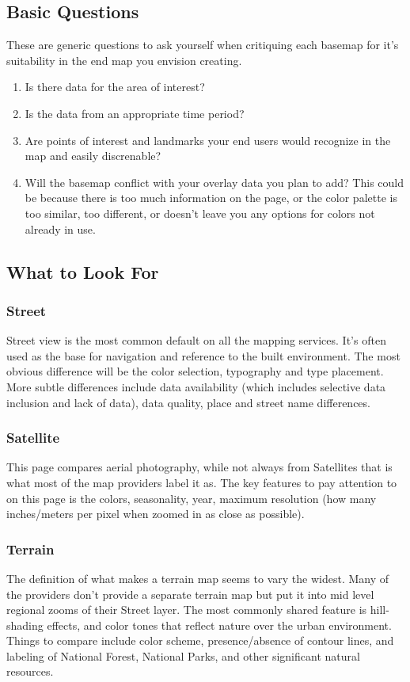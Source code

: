 \documentclass[12pt,letterpaper]{article}
\begin{document}
\subsection{Basic Questions}
These are generic questions to ask yourself when critiquing each basemap for it's suitability in the end map you envision creating.
\begin{enumerate}
\item Is there data for the area of interest?
\item Is the data from an appropriate time period?
\item Are points of interest and landmarks your end users would recognize in the map and easily discrenable?
\item Will the basemap conflict with your overlay data you plan to add? This could be because there is too much information on the page, or the color palette is too similar, too different, or doesn't leave you any options for colors not already in use.
\end{enumerate}

\subsection{What to Look For}
\subsubsection{Street}
Street view is the most common default on all the mapping services. It's often used as the base for navigation and reference to the built environment. The most obvious difference will be the color selection, typography and type placement. More subtle differences include data availability (which includes selective data inclusion and lack of data), data quality, place and street name differences.  

\subsubsection{Satellite}
This page compares aerial photography, while not always from Satellites that is what most of the map providers label it as. The key features to pay attention to on this page is the colors, seasonality, year, maximum resolution (how many inches/meters per pixel when zoomed in as close as possible).

\subsubsection{Terrain}
The definition of what makes a terrain map seems to vary the widest. Many of the providers don't provide a separate terrain map but put it into mid level regional zooms of their Street layer. The most commonly shared feature is hill-shading effects, and color tones that reflect nature over the urban environment. Things to compare include color scheme, presence/absence of contour lines, and labeling of National Forest, National Parks, and other significant natural resources.
\end{document}
